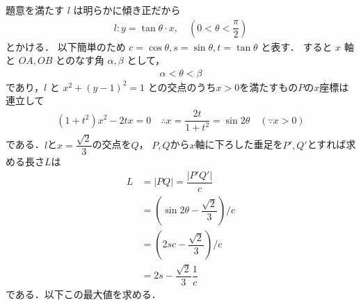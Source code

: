 \documentclass[../../main.tex]{subfiles}
\begin{document}
題意を満たす $l$ は明らかに傾き正だから
\begin{align}
  l : y = \tan\theta \cdot x, \quad \left(0 < \theta < \dfrac{\pi}{2}\right)
\end{align}
とかける．
以下簡単のため $c = \cos\theta, s = \sin\theta, t = \tan\theta$ と表す．
すると $x$ 軸と $OA, OB$ とのなす角 $\alpha, \beta$ として，
\begin{align}
  \alpha < \theta < \beta \label{eq:2}
\end{align}
であり，$l$ と $x^2+(y-1)^2=1$ との交点のうち$x>0$を満たすもの$P$の$x$座標は連立して
\begin{align}
  (1+t^2)x^2 - 2tx = 0 \quad
  \therefore
  x = \dfrac{2t}{1+t^2} = \sin 2\theta \quad (\because x > 0)
\end{align}
である．$l$と$x=\dfrac{\sqrt{2}}{3}$の交点を$Q$，
$P,Q$から$x$軸に下ろした垂足を$P',Q'$とすれば求める長さ$L$は
\begin{align}
  L & = |PQ| = \dfrac{|P'Q'|}{c} \\
  & = \left( \sin 2\theta - \dfrac{\sqrt{2}}{3} \right) / c \\
  & = \left( 2sc - \dfrac{\sqrt{2}}{3} \right) / c \\
  & = 2s - \dfrac{\sqrt{2}}{3}\dfrac{1}{c}  \label{eq:3}
\end{align}
である．以下この最大値を求める．
\end{document}

